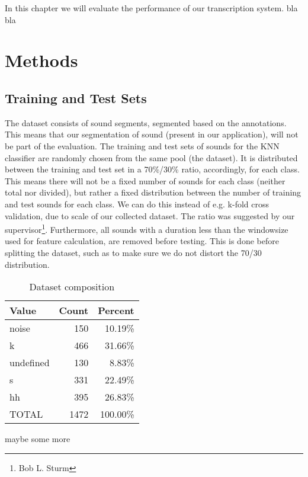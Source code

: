 In this chapter we will evaluate the performance of our transcription system. bla bla

\section{Methods}

	\subsection{Training and Test Sets}
		The dataset consists of sound segments, segmented based on the annotations. This means that our segmentation of sound (present in our application), will not be part of the evaluation.
		The training and test sets of sounds for the KNN classifier are randomly chosen from the same pool (the dataset). It is distributed between the training and test set in a 70\%/30\% ratio, accordingly, for each class. This means there will not be a fixed number of sounds for each class (neither total nor divided), but rather a fixed distribution between the number of training and test sounds for each class. We can do this instead of e.g. k-fold cross validation, due to scale of our collected dataset. The ratio was suggested by our supervisor\footnote{Bob L. Sturm}. Furthermore, all sounds with a duration less than the windowsize used for feature calculation, are removed before testing. This is done before splitting the dataset, such as to make sure we do not distort the 70/30 distribution.

		\begin{table}
			\centering
			\begin{tabular}{|l|r|r|}
				\hline
				Value  &  Count  & Percent \\ \hline
		      noise    &  150    & 10.19\% \\ \hline
		          k    &  466    & 31.66\% \\ \hline
		  undefined    &  130    &  8.83\% \\ \hline
		          s    &  331    & 22.49\% \\ \hline
		         hh    &  395    & 26.83\% \\ \hline
		      TOTAL    &  1472	 & 100.00\% \\ \hline

			\end{tabular}
			\caption{Dataset composition}
		\end{table}

		maybe some more

